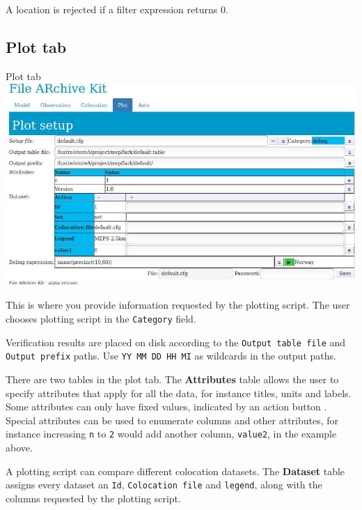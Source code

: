 \documentclass[letterpaper,10pt,twoside,twocolumn,openany]{book}
\begin{document}
\begin{quotebox}
  A location is rejected if a filter expression returns 0.
\end{quotebox}


\subsection{Plot tab}

\begin{paperbox}{Plot tab}
  \includegraphics[width=\columnwidth]{fark_plot.jpg}
\end{paperbox}

This is where you provide information requested by the plotting script.
The user chooses plotting script in the \lstinline!Category! field.

Verification results are placed on disk according to the \lstinline!Output table file! and \lstinline!Output prefix! paths.
Use \lstinline!YY MM DD HH MI! as wildcards in the output paths.

There are two tables in the plot tab. 
The {\bf Attributes} table allows the user to specify attributes that apply for all the data,
for instance titles, units and labels.
Some attributes can only have fixed values, indicated by an action button
 .
Special attributes can be used to enumerate columns and other attributes,
for instance increasing \lstinline!n! to \lstinline!2! would add another column,  \lstinline!value2!, in the example above.

A plotting script can compare different colocation datasets.
The {\bf Dataset} table assigns every dataset an \lstinline!Id!, \lstinline!Colocation file! and 
\lstinline!legend!, along with the columns requested by the plotting script.
\end{document}
